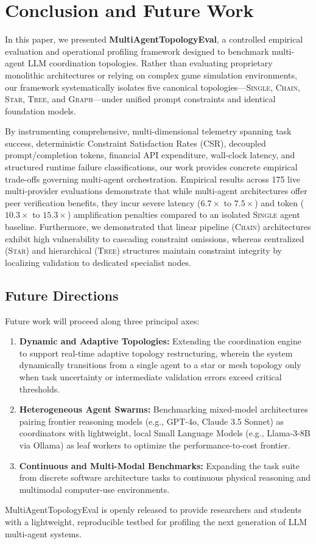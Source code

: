 \section{Conclusion and Future Work}
\label{sec:conclusion}

In this paper, we presented \textbf{MultiAgentTopologyEval}, a controlled empirical evaluation and operational profiling framework designed to benchmark multi-agent LLM coordination topologies. Rather than evaluating proprietary monolithic architectures or relying on complex game simulation environments, our framework systematically isolates five canonical topologies---\textsc{Single}, \textsc{Chain}, \textsc{Star}, \textsc{Tree}, and \textsc{Graph}---under unified prompt constraints and identical foundation models.

By instrumenting comprehensive, multi-dimensional telemetry spanning task success, deterministic Constraint Satisfaction Rates (CSR), decoupled prompt/completion tokens, financial API expenditure, wall-clock latency, and structured runtime failure classifications, our work provides concrete empirical trade-offs governing multi-agent orchestration. Empirical results across 175 live multi-provider evaluations demonstrate that while multi-agent architectures offer peer verification benefits, they incur severe latency ($6.7\times$ to $7.5\times$) and token ($10.3\times$ to $15.3\times$) amplification penalties compared to an isolated \textsc{Single} agent baseline. Furthermore, we demonstrated that linear pipeline (\textsc{Chain}) architectures exhibit high vulnerability to cascading constraint omissions, whereas centralized (\textsc{Star}) and hierarchical (\textsc{Tree}) structures maintain constraint integrity by localizing validation to dedicated specialist nodes.

\subsection{Future Directions}
Future work will proceed along three principal axes:
\begin{enumerate}
    \item \textbf{Dynamic and Adaptive Topologies:} Extending the coordination engine to support real-time adaptive topology restructuring, wherein the system dynamically transitions from a single agent to a star or mesh topology only when task uncertainty or intermediate validation errors exceed critical thresholds.
    \item \textbf{Heterogeneous Agent Swarms:} Benchmarking mixed-model architectures pairing frontier reasoning models (e.g., GPT-4o, Claude 3.5 Sonnet) as coordinators with lightweight, local Small Language Models (e.g., Llama-3-8B via Ollama) as leaf workers to optimize the performance-to-cost frontier.
    \item \textbf{Continuous and Multi-Modal Benchmarks:} Expanding the task suite from discrete software architecture tasks to continuous physical reasoning and multimodal computer-use environments.
\end{enumerate}

MultiAgentTopologyEval is openly released to provide researchers and students with a lightweight, reproducible testbed for profiling the next generation of LLM multi-agent systems.

